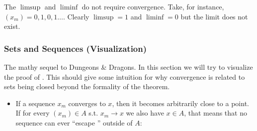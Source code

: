 \documentclass{article}
\begin{document}
The $\limsup$ and $\liminf$ do not require convergence. Take, for instance, $(x_m) = 0, 1, 0, 1 \ldots$. Clearly $\limsup = 1$ and $\liminf = 0$ but the limit does not exist.

\subsubsection{Sets and Sequences (Visualization)}
\label{ssub:sets_and_sequences_visualization_}

The mathy sequel to Dungeons \& Dragons. In this section we will try to visualize the proof of . This should give some intuition for why convergence is related to sets being closed beyond the formality of the theorem.
\begin{itemize}[label=$\bullet$]
  \item If a sequence $x_m$ converges to $x$, then it becomes arbitrarily close to a point. If for every $(x_m) \in A$ s.t. $x_m \to x$ we also have $x \in A$, that means that no sequence can ever ``escape '' outside of $A$:
    \begin{figure}[H]
      \centering
    \end{figure}


\end{itemize}
\end{document}
